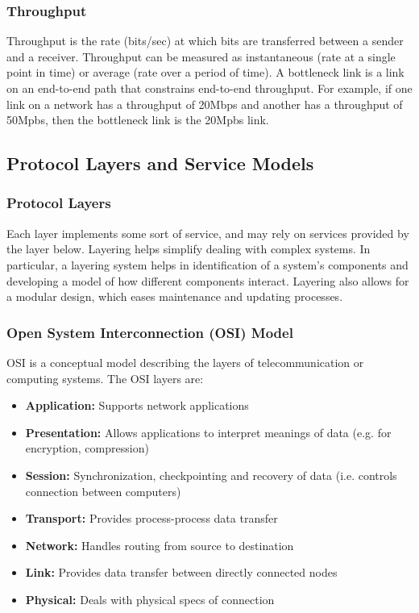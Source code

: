 \documentclass[12pt,titlepage]{article}
\begin{document}
      \subsubsection{Throughput}
        Throughput is the rate (bits/sec) at which bits are transferred between a sender and a receiver. Throughput can be measured as instantaneous
        (rate at a single point in time) or average (rate over a period of time). A bottleneck link is a link on an end-to-end path that constrains
        end-to-end throughput. For example, if one link on a network has a throughput of 20Mbps and another has a throughput of 50Mpbs, then the
        bottleneck link is the 20Mpbs link.

    \subsection{Protocol Layers and Service Models}
      \subsubsection{Protocol Layers}
        Each layer implements some sort of service, and may rely on services provided by the layer below. Layering helps simplify dealing with
        complex systems. In particular, a layering system helps in identification of a system's components and developing a model of how different
        components interact. Layering also allows for a modular design, which eases maintenance and updating processes.

      \subsubsection{Open System Interconnection (OSI) Model}
        OSI is a conceptual model describing the layers of telecommunication or computing systems. The OSI layers are:
        \begin{itemize}
          \item \textbf{Application:} Supports network applications
          \item \textbf{Presentation:} Allows applications to interpret meanings of data (e.g. for encryption, compression)
          \item \textbf{Session:} Synchronization, checkpointing and recovery of data (i.e. controls connection between computers)
          \item \textbf{Transport:} Provides process-process data transfer
          \item \textbf{Network:} Handles routing from source to destination
          \item \textbf{Link:} Provides data transfer between directly connected nodes
          \item \textbf{Physical:} Deals with physical specs of connection
        \end{itemize}
\end{document}
